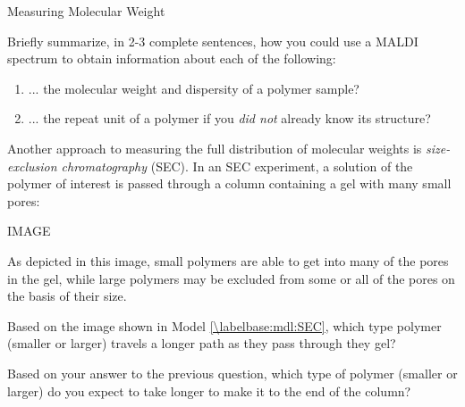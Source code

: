 \begin{activity}{Measuring Molecular Weight}
\begin{ctqs}
	\question Briefly summarize, in 2-3 complete sentences, how you could use a MALDI spectrum to obtain information about each of the following:
	
		\begin{enumerate}
			\item ... the molecular weight and dispersity of a polymer sample?
		\begin{solution}[2in]
		\end{solution}
				
			\item ... the repeat unit of a polymer if you \emph{did not} already know its structure?
		\begin{solution}[2in]
		\end{solution}
		
		\end{enumerate}
		
		
\end{ctqs}



\begin{model}
\label{\labelbase:mdl:SEC}
	
	Another approach to measuring the full distribution of molecular weights is \emph{size-exclusion chromatography} (SEC).
	In an SEC experiment, a solution of the polymer of interest is passed through a column containing a gel with many small pores:
	
	IMAGE
	
	As depicted in this image, small polymers are able to get into many of the pores in the gel, while large polymers may be excluded from some or all of the pores on the basis of their size.

\end{model}

\begin{ctqs}

	\question Based on the image shown in Model \ref{\labelbase:mdl:SEC}, which type polymer (smaller or larger) travels a longer path as they pass through they gel?
	
	\question Based on your answer to the previous question, which type of polymer (smaller or larger) do you expect to take longer to make it to the end of the column?
	
\end{ctqs}



\end{activity}
